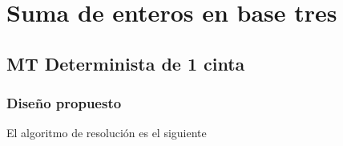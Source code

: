 \section{Suma de enteros en base tres}


\subsection{MT Determinista de 1 cinta}

\subsubsection*{Diseño propuesto}
El algoritmo de resolución es el siguiente